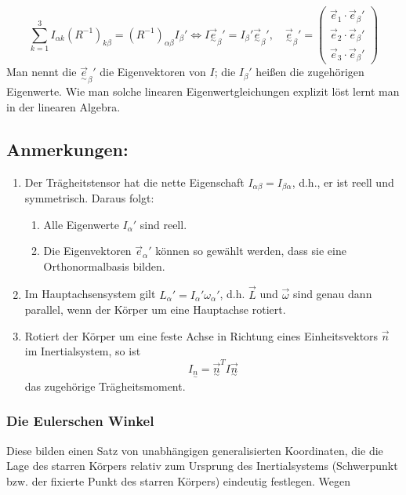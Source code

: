 \documentclass[10pt, letterpaper]{article}
\begin{document}
\[
\sum_{k=1}^3 I_{\alpha k}(R^{-1})_{k\beta} = (R^{-1})_{\alpha\beta}I_\beta' \Leftrightarrow I\vec{\underset{\sim}{e}}_\beta' = I_\beta'\vec{\underset{\sim}{e}}_\beta', \quad \vec{\underset{\sim}{e}}_\beta' = \begin{pmatrix}
\vec{e}_1 \cdot \vec{e}_\beta' \\
\vec{e}_2 \cdot \vec{e}_\beta' \\
\vec{e}_3 \cdot \vec{e}_\beta'
\end{pmatrix}
\]
Man nennt die $\vec{\underset{\sim}{e}}_\beta'$ die Eigenvektoren von $I$; die $I_\beta'$ heißen die zugehörigen Eigenwerte. Wie man solche linearen Eigenwertgleichungen explizit löst lernt man in der linearen Algebra.



\subsection*{Anmerkungen:}
\begin{enumerate}
  \item Der Trägheitstensor hat die nette Eigenschaft $I_{\alpha\beta} = I_{\beta\alpha}$, d.h., er ist reell und symmetrisch. Daraus folgt:
  \begin{enumerate}
    \item Alle Eigenwerte $I_\alpha'$ sind reell.
    \item Die Eigenvektoren $\vec{e}_\alpha'$ können so gewählt werden, dass sie eine Orthonormalbasis bilden.
  \end{enumerate}
  
  \item Im Hauptachsensystem gilt $L_\alpha' = I_\alpha'\omega_\alpha'$, d.h. $\vec{L}$ und $\vec{\omega}$ sind genau dann parallel, wenn der Körper um eine Hauptachse rotiert.

  \item Rotiert der Körper um eine feste Achse in Richtung eines Einheitsvektors $\vec{n}$ im Inertialsystem, so ist
  \[
  I_{\underset{\sim}{n}} = \vec{\underset{\sim}{n}}^T I \vec{\underset{\sim}{n}}
  \]
  das zugehörige Trägheitsmoment.
\end{enumerate}




\subsubsection{Die Eulerschen Winkel}

Diese bilden einen Satz von unabhängigen generalisierten Koordinaten, die die Lage des starren Körpers relativ zum Ursprung des Inertialsystems (Schwerpunkt bzw. der fixierte Punkt des starren Körpers) eindeutig festlegen. Wegen
\end{document}
